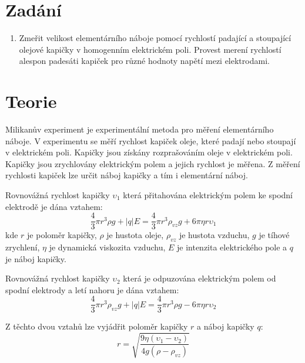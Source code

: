 \documentclass[a4paper,11pt]{article}
\begin{document}
\vskip10pt
    \begin{minipage}[t]{0.5\textwidth} 
        \section{Zadání}    
            \begin{enumerate}
                \item Zmeřit velikost elementárního náboje pomocí rychlostí padající a stoupající olejové kapičky v homogenním elektrickém poli. Provest merení rychlostí alespon padesáti kapiček pro různé hodnoty napětí mezi elektrodami.
            \end{enumerate}
        \section{Teorie}
            Milikanův experiment je experimentální metoda pro měření elementárního náboje. V experimentu se měří rychlost kapiček oleje, které padají nebo stoupají v elektrickém poli. Kapičky jsou získány rozprašováním oleje v elektrickém poli. Kapičky jsou zrychlovány elektrickým polem a jejich rychlost je měřena. Z měření rychlosti kapiček lze určit náboj kapičky a tím i elementární náboj.
            \par Rovnovážná rychlost kapičky $\upsilon_1$ která přitahována elektrickým polem ke spodní elektrodě je dána vztahem:
            \begin{equation}
                \frac{4}{3} \pi r^3 \rho g + |q| E = \frac{4}{3} \pi r^3 \rho_{vz} g + 6 \pi \eta r \upsilon_1
            \end{equation}
            kde $r$ je poloměr kapičky, $\rho$ je hustota oleje, $\rho_{vz}$ je hustota vzduchu, $g$ je tíhové zrychlení, $\eta$ je dynamická viskozita vzduchu, $E$ je intenzita elektrického pole a $q$ je náboj kapičky.
            \par Rovnovážná rychlost kapičky $\upsilon_2$ která je odpuzována elektrickým polem od spodní elektrody a letí nahoru je dána vztahem:
            \begin{equation}
                \frac{4}{3} \pi r^3 \rho_{vz} g + |q| E = \frac{4}{3} \pi r^3 \rho g - 6 \pi \eta r \upsilon_2
            \end{equation}
            \par Z těchto dvou vztahů lze vyjádřit poloměr kapičky $r$ a náboj kapičky $q$:
            \begin{equation}
                r = \sqrt{\frac{9 \eta (\upsilon_1 - \upsilon_2)}{4 g (\rho - \rho_{vz})}}
            \end{equation}
    \end{minipage}
\end{document}
